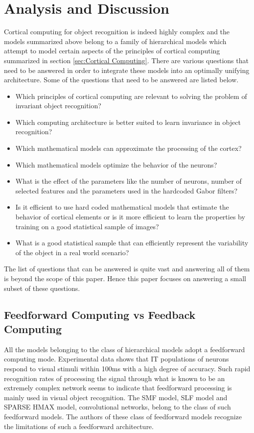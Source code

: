 \documentclass[12pt,twoside]{article}
\theoremstyle{plain}
\theoremstyle{definition}
\theoremstyle{remark}
\begin{document}
\section{Analysis and Discussion}
\label{sec:Eval}
Cortical computing for object recognition is indeed highly complex and the models summarized above belong to a family of hierarchical models which attempt to model certain aspects of the principles of cortical computing summarized in section \ref{sec:Cortical Computing}. There are various questions that need to be answered in order to integrate these models into an optimally unifying architecture. Some of the questions that need to be answered are listed below. 
\begin{itemize}
\item Which principles of cortical computing are relevant to solving the problem of invariant object recognition? 
\item Which computing architecture is better suited to learn invariance in object recognition? 
\item Which mathematical models can approximate the processing of the cortex? 
\item Which mathematical models optimize the behavior of the neurons?
\item What is the effect of the parameters like the number of neurons, number of selected features and the parameters used in the hardcoded Gabor filters? 
\item Is it efficient to use hard coded mathematical models that estimate the behavior of cortical elements or is it more efficient to learn the properties by training on a good statistical sample of images?
\item What is a good statistical sample that can efficiently represent the variability of the object in a real world scenario?
\end{itemize}
The list of questions that can be answered is quite vast and answering all of them is beyond the scope of this paper. Hence this paper focuses on answering a small subset of these questions. 
\subsection{Feedforward Computing vs Feedback Computing}

All the models belonging to the class of hierarchical models adopt a feedforward computing mode. Experimental data shows that IT populations of neurons respond to visual stimuli within 100ms\cite{ChouP.Hung.GabrielKreiman2005} with a high degree of accuracy. Such rapid recognition rates of processing the signal through what is known to be an extremely complex network seems to indicate that feedforward processing is mainly used in visual object recognition\cite{ThomasSerre2007a}. The SMF model, SLF model and SPARSE HMAX model, convolutional networks\cite{K.Kavukcuoglu2009},\cite{Krizhevsky2012} belong to the class of such feedforward models. The authors of these class of feedforward models recognize the limitations of such a feedforward architecture. 
\end{document}
